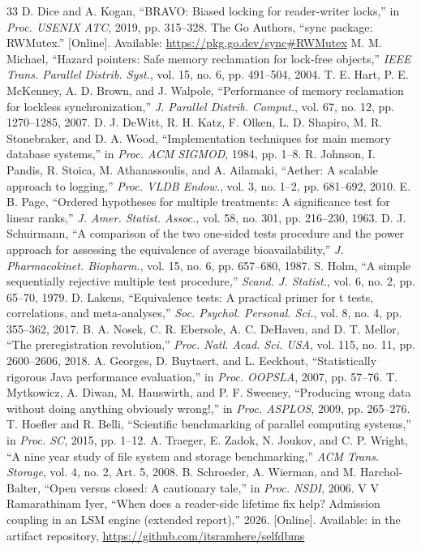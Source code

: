 \documentclass[conference]{IEEEtran}
\begin{document}
\begin{thebibliography}{33}
 D. Dice and A. Kogan, ``BRAVO: Biased locking for reader-writer locks,'' in \emph{Proc. USENIX ATC}, 2019, pp. 315--328.
 The Go Authors, ``sync package: RWMutex.'' [Online]. Available: \url{https://pkg.go.dev/sync#RWMutex}
 M. M. Michael, ``Hazard pointers: Safe memory reclamation for lock-free objects,'' \emph{IEEE Trans. Parallel Distrib. Syst.}, vol. 15, no. 6, pp. 491--504, 2004.
 T. E. Hart, P. E. McKenney, A. D. Brown, and J. Walpole, ``Performance of memory reclamation for lockless synchronization,'' \emph{J. Parallel Distrib. Comput.}, vol. 67, no. 12, pp. 1270--1285, 2007.
 D. J. DeWitt, R. H. Katz, F. Olken, L. D. Shapiro, M. R. Stonebraker, and D. A. Wood, ``Implementation techniques for main memory database systems,'' in \emph{Proc. ACM SIGMOD}, 1984, pp. 1--8.
 R. Johnson, I. Pandis, R. Stoica, M. Athanassoulis, and A. Ailamaki, ``Aether: A scalable approach to logging,'' \emph{Proc. VLDB Endow.}, vol. 3, no. 1--2, pp. 681--692, 2010.
 E. B. Page, ``Ordered hypotheses for multiple treatments: A significance test for linear ranks,'' \emph{J. Amer. Statist. Assoc.}, vol. 58, no. 301, pp. 216--230, 1963.
 D. J. Schuirmann, ``A comparison of the two one-sided tests procedure and the power approach for assessing the equivalence of average bioavailability,'' \emph{J. Pharmacokinet. Biopharm.}, vol. 15, no. 6, pp. 657--680, 1987.
 S. Holm, ``A simple sequentially rejective multiple test procedure,'' \emph{Scand. J. Statist.}, vol. 6, no. 2, pp. 65--70, 1979.
 D. Lakens, ``Equivalence tests: A practical primer for t tests, correlations, and meta-analyses,'' \emph{Soc. Psychol. Personal. Sci.}, vol. 8, no. 4, pp. 355--362, 2017.
 B. A. Nosek, C. R. Ebersole, A. C. DeHaven, and D. T. Mellor, ``The preregistration revolution,'' \emph{Proc. Natl. Acad. Sci. USA}, vol. 115, no. 11, pp. 2600--2606, 2018.
 A. Georges, D. Buytaert, and L. Eeckhout, ``Statistically rigorous Java performance evaluation,'' in \emph{Proc. OOPSLA}, 2007, pp. 57--76.
 T. Mytkowicz, A. Diwan, M. Hauswirth, and P. F. Sweeney, ``Producing wrong data without doing anything obviously wrong!,'' in \emph{Proc. ASPLOS}, 2009, pp. 265--276.
 T. Hoefler and R. Belli, ``Scientific benchmarking of parallel computing systems,'' in \emph{Proc. SC}, 2015, pp. 1--12.
 A. Traeger, E. Zadok, N. Joukov, and C. P. Wright, ``A nine year study of file system and storage benchmarking,'' \emph{ACM Trans. Storage}, vol. 4, no. 2, Art. 5, 2008.
 B. Schroeder, A. Wierman, and M. Harchol-Balter, ``Open versus closed: A cautionary tale,'' in \emph{Proc. NSDI}, 2006.
 V V Ramarathinam Iyer, ``When does a reader-side lifetime fix help? Admission coupling in an LSM engine (extended report),'' 2026. [Online]. Available:  in the artifact repository, \url{https://github.com/itsramhere/selfdbms}
\end{thebibliography}
\end{document}
